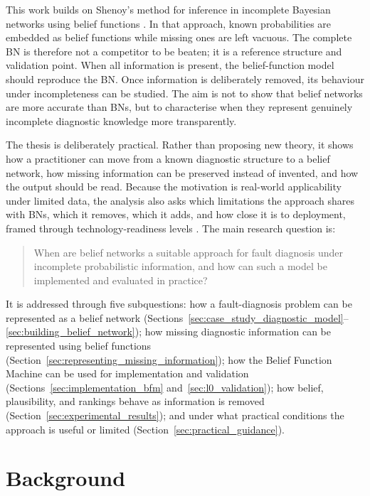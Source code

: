 \documentclass[runningheads]{llncs}
\begin{document}
This work builds on Shenoy's method for inference in incomplete Bayesian networks using belief functions \cite{Shenoy2023IncompleteBN}. In that approach, known probabilities are embedded as belief functions while missing ones are left vacuous. The complete BN is therefore not a competitor to be beaten; it is a reference structure and validation point. When all information is present, the belief-function model should reproduce the BN. Once information is deliberately removed, its behaviour under incompleteness can be studied. The aim is not to show that belief networks are more accurate than BNs, but to characterise when they represent genuinely incomplete diagnostic knowledge more transparently.

The thesis is deliberately practical. Rather than proposing new theory, it shows how a practitioner can move from a known diagnostic structure to a belief network, how missing information can be preserved instead of invented, and how the output should be read. Because the motivation is real-world applicability under limited data, the analysis also asks which limitations the approach shares with BNs, which it removes, which it adds, and how close it is to deployment, framed through technology-readiness levels \cite{Mankins1995}. The main research question is:

\begin{quote}
When are belief networks a suitable approach for fault diagnosis under incomplete probabilistic information, and how can such a model be implemented and evaluated in practice?
\end{quote}

It is addressed through five subquestions: how a fault-diagnosis problem can be represented as a belief network (Sections~\ref{sec:case_study_diagnostic_model}--\ref{sec:building_belief_network}); how missing diagnostic information can be represented using belief functions (Section~\ref{sec:representing_missing_information}); how the Belief Function Machine can be used for implementation and validation (Sections~\ref{sec:implementation_bfm} and~\ref{sec:l0_validation}); how belief, plausibility, and rankings behave as information is removed (Section~\ref{sec:experimental_results}); and under what practical conditions the approach is useful or limited (Section~\ref{sec:practical_guidance}).

\section{Background}
\label{sec:background}
\end{document}
